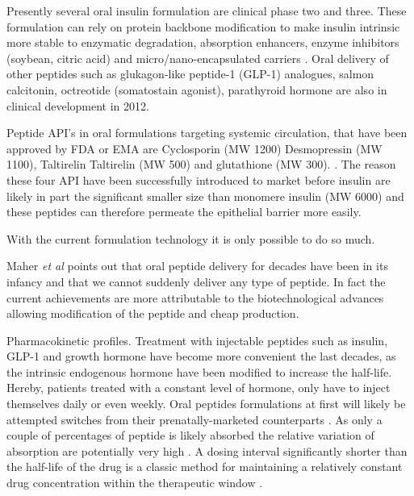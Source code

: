 Presently several oral insulin formulation are clinical phase two and three. These formulation can rely on protein backbone modification to make insulin intrinsic more stable to enzymatic degradation, absorption enhancers, enzyme inhibitors (soybean, citric acid) and micro/nano-encapsulated carriers \cite{aguirre2016current}. Oral delivery of other peptides such as glukagon-like peptide-1 (GLP-1) analogues, salmon calcitonin, octreotide (somatostain agonist), parathyroid hormone are also in clinical development in 2012.

Peptide API's in oral formulations targeting systemic circulation, that have been approved by FDA or EMA are Cyclosporin (MW 1200) Desmopressin (MW 1100), Taltirelin Taltirelin  (MW 500) and glutathione (MW 300). \cite{aguirre2016current}. The reason these four API have been successfully introduced to market before insulin are likely in part the significant smaller size than monomere insulin (MW 6000) and these peptides can therefore permeate the epithelial barrier more easily. 


With the current formulation technology it is only possible to do so much. 

Maher \textit{et al} points out that oral peptide delivery  for decades have been in its infancy and that we cannot suddenly deliver any type of peptide. In fact the current achievements are more attributable to the biotechnological advances allowing modification of the peptide and cheap production.

Pharmacokinetic profiles. Treatment with injectable peptides such as insulin, GLP-1 and growth hormone have become more convenient the last decades, as the intrinsic endogenous hormone have been modified to increase the half-life. Hereby, patients treated with a constant level of hormone, only have to inject themselves daily or even weekly. Oral peptides formulations at first will likely be attempted switches from their prenatally-marketed counterparts \cite{maher2014formulation}. As only a couple of percentages of peptide is likely absorbed the relative variation of absorption are potentially very high \cite{gabor2010improving}. A dosing interval significantly shorter than the half-life of the drug is a classic method for maintaining a relatively constant drug concentration within the therapeutic window \cite{tozer2006introduction}.

